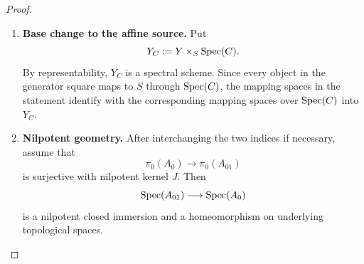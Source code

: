 \begin{proof}
\leavevmode
\begin{enumerate}[label=\textup{(\arabic*)}]
    \item \textbf{Base change to the affine source.}
    Put
    \[
        Y_C:=Y\times_S\operatorname{Spec}(C).
    \]
    By representability, \(Y_C\) is a spectral scheme. Since every object in the
    generator square maps to \(S\) through \(\operatorname{Spec}(C)\), the mapping spaces in the
    statement identify with the corresponding mapping spaces over \(\operatorname{Spec}(C)\)
    into \(Y_C\).
    \item \textbf{Nilpotent geometry.}
    After interchanging the two indices if necessary, assume that
    \[
        \pi_0(A_0)\longrightarrow\pi_0(A_{01})
    \]
    is surjective with nilpotent kernel \(J\). Then
    \[
        \operatorname{Spec}(A_{01})\longrightarrow\operatorname{Spec}(A_0)
    \]
    is a nilpotent closed immersion and a homeomorphism on underlying
    topological spaces.


\end{enumerate}
\end{proof}

